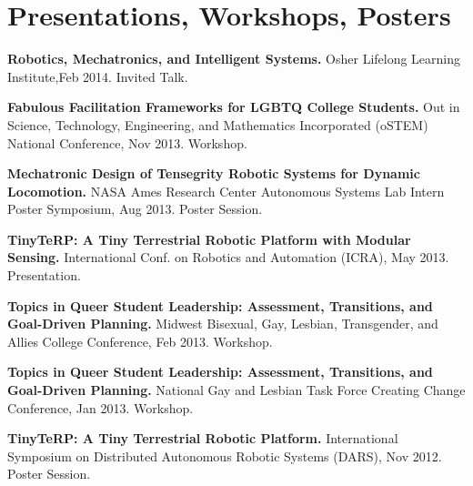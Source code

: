 \documentclass[letterpaper]{deedy-resume} %
\begin{document}
\begin{minipage}[t]{0.66\textwidth}
\begin{tightitemize}
\end{tightitemize}

\sectionspace


\section{Presentations, Workshops, Posters}

\vspace{0.4cm}
\begin{tightitemize}

\item \textbf{Robotics, Mechatronics, and Intelligent Systems.} Osher Lifelong Learning Institute,Feb 2014. Invited Talk.

\item \textbf{Fabulous Facilitation Frameworks for LGBTQ College Students.} Out in Science, Technology, Engineering, and Mathematics Incorporated (oSTEM) National Conference, Nov 2013. Workshop.

\item \textbf{Mechatronic Design of Tensegrity Robotic Systems for Dynamic Locomotion.} NASA Ames Research Center Autonomous Systems Lab Intern Poster Symposium, Aug 2013. Poster Session.

\item \textbf{TinyTeRP: A Tiny Terrestrial Robotic Platform with Modular Sensing.} International Conf. on Robotics and Automation (ICRA), May 2013. Presentation.

\item \textbf{Topics in Queer Student Leadership: Assessment, Transitions, and Goal-Driven Planning.} Midwest Bisexual, Gay, Lesbian, Transgender, and Allies College Conference, Feb 2013. Workshop.

\item \textbf{Topics in Queer Student Leadership: Assessment, Transitions, and Goal-Driven Planning.} National Gay and Lesbian Task Force Creating Change Conference, Jan 2013. Workshop.

\item \textbf{TinyTeRP: A Tiny Terrestrial Robotic Platform.} International Symposium on Distributed Autonomous Robotic Systems (DARS), Nov 2012. Poster Session.

\end{tightitemize}


\end{minipage}%
\end{document}
